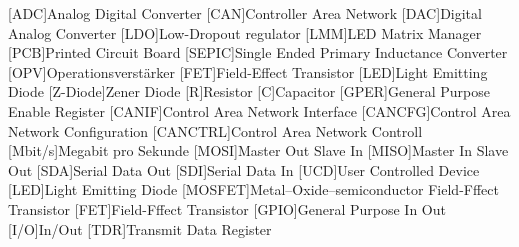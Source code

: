 
\begin{acronym}[ACRONYM]
[ADC]{Analog Digital Converter}
[CAN]{Controller Area Network}
[DAC]{Digital Analog Converter}
[LDO]{Low-Dropout regulator}
[LMM]{LED Matrix Manager}
[PCB]{Printed Circuit Board}
[SEPIC]{Single Ended Primary Inductance Converter}
[OPV]{Operationsverstärker}
[FET]{Field-Effect Transistor}
[LED]{Light Emitting Diode}
[Z-Diode]{Zener Diode}
[R]{Resistor}
[C]{Capacitor}
[GPER]{General Purpose Enable Register}
[CANIF]{Control Area Network Interface}
[CANCFG]{Control Area Network Configuration}
[CANCTRL]{Control Area Network Controll}
[Mbit/s]{Megabit pro Sekunde}
[MOSI]{Master Out Slave In}
[MISO]{Master In Slave Out}
[SDA]{Serial Data Out}
[SDI]{Serial Data In}
[UCD]{User Controlled Device}
[LED]{Light Emitting Diode}
[MOSFET]{Metal–Oxide–semiconductor Field-Fffect Transistor}
[FET]{Field-Fffect Transistor}
[GPIO]{General Purpose In Out}
[I/O]{In/Out}
[TDR]{Transmit Data Register}
\end{acronym}\newpage

